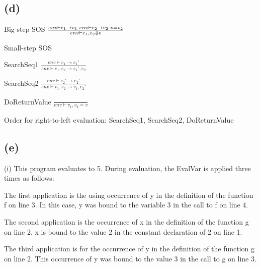 \documentclass[11pt, oneside]{article}
\newcommand{\forceindent}{\leavevmode{\parindent=1.5em\indent}}
\begin{document}
\subsection*{(d)}
\forceindent \par Big-step SOS
$
\frac{
	env \vdash e_1 \rightarrow v_1 \thinspace \thinspace env \vdash e_2 \rightarrow v_2 \thinspace \thinspace v = v_2
}
{
	env \vdash e_1, e_2 \Downarrow v
}
$

\par Small-step SOS
\par SearchSeq1
$
\frac{
	env \vdash e_1 \rightarrow e_1'
}
{
	env \vdash e_1, e_2 \rightarrow e_1', e_2
}
$
\par SearchSeq2
$
\frac{
	env \vdash e_2' \rightarrow e_2'
}
{
	env \vdash v_1, e_2 \rightarrow v_1, e_2'
}
$
\par DoReturnValue
$
\frac{
}
{
	env \vdash v_1, v_2 = v
}
$
\par Order for right-to-left evaluation: SearchSeq1, SearchSeq2, DoReturnValue

\subsection*{(e)}
\forceindent \par (i) This program evaluates to 5. During evaluation, the EvalVar is applied three times as follows:
\par The first application is the using occurrence of y in the definition of the function f on line 3. In this case, y was bound to the variable 3 in the call to f on line 4. 
\par The second application is the occurrence of x in the definition of the function g on line 2. x is bound to the value 2 in the constant declaration of 2 on line 1.
\par The third application is for the occurrence of y in the definition of the function g on line 2. This occurrence of y was bound to the value 3 in the call to g on line 3.
\end{document}
